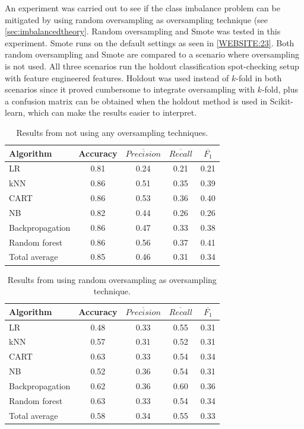	An experiment was carried out to see if the class imbalance problem can be mitigated by using random oversampling as oversampling technique (see \ref{sec:imbalancedtheory}. Random oversampling and Smote was tested in this experiment. Smote runs on the default settings as seen in \ref{WEBSITE:23}. Both random oversampling and Smote are compared to a scenario where oversampling is not used. All three scenarios run the holdout classification spot-checking setup with feature engineered features. Holdout was used instead of $k$-fold in both scenarios since it proved cumbersome to integrate oversampling with $k$-fold, plus a confusion matrix can be obtained when the holdout method is used in Scikit-learn, which can make the results easier to interpret. 

	\begin{table}[H]
	\centering
	\caption{Results from not using any oversampling techniques. }
		\begin{tabular}[5]{l | c | c | c | c}
    			Algorithm & Accuracy & $\overline{Precision}$ & $\overline{Recall}$ & $\overline{F_1}$ \\
    			\hline
			LR & 0.81 & 0.24 & 0.21 & 0.21  \\
			kNN & 0.86 & 0.51 & 0.35 & 0.39  \\
			CART & 0.86 & 0.53 & 0.36 & 0.40 \\
			NB & 0.82 & 0.44 & 0.26 & 0.26  \\
			Backpropagation & 0.86 & 0.47 & 0.33 &  0.38  \\
			Random forest & 0.86 & 0.56 & 0.37 & 0.41  \\
			\hline
			Total average & 0.85 & 0.46 & 0.31 & 0.34
			\label{table:no_oversampling}
		\end{tabular}
	\end{table}

	\begin{table}[H]
	\centering
	\caption{Results from using random oversampling as oversampling technique.}
		\begin{tabular}[5]{l | c | c | c | c}
    			Algorithm & Accuracy & $\overline{Precision}$ & $\overline{Recall}$ & $\overline{F_1}$ \\
    			\hline
			LR & 0.48 & 0.33 & 0.55 & 0.31 \\
			kNN & 0.57 &  0.31 & 0.52 &  0.31 \\
			CART & 0.63 & 0.33 & 0.54 &  0.34 \\
			NB &  0.52 & 0.36 & 0.54 & 0.31 \\
			Backpropagation & 0.62 & 0.36 & 0.60 & 0.36 \\
			Random forest & 0.63 & 0.33 & 0.54 &  0.34 \\
			\hline
			Total average & 0.58 & 0.34 & 0.55 & 0.33 
			\label{table:random_oversampling}
		\end{tabular}
	\end{table}

